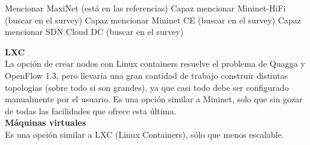 Mencionar MaxiNet (está en las referencias)
Capaz mencionar Mininet-HiFi (buscar en el survey)
Capaz mencionar Mininet CE (buscar en el survey)
Capaz mencionar SDN Cloud DC (buscar en el survey)



\textbf{LXC}\\
La opción de crear nodos con Linux containers resuelve el problema de Quagga y OpenFlow 1.3, pero llevaría una gran cantidad de trabajo construir distintas topologias (sobre todo si son grandes), ya que casi todo debe ser configurado manualmente por el usuario. Es una opción similar a Mininet, solo que sin gozar de todas las facilidades que ofrece esta última.\\


\textbf{Máquinas virtuales}\\
Es una opción similar a LXC (Linux Containers), sólo que menos escalable.
\\